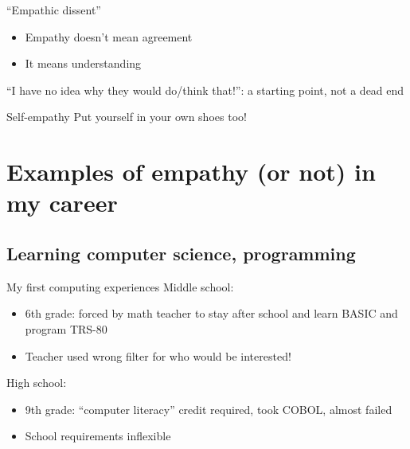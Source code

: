 %

\begin{frame}{``Empathic dissent''}
  \begin{itemize}
  \item Empathy doesn't mean agreement
  \item It means understanding
  \end{itemize}

  ``I have no idea why they would do/think that!'': a starting point,
  not a dead end
\end{frame}

\begin{frame}{Self-empathy}
  Put yourself in your own shoes too!
\end{frame}

\section{Examples of empathy (or not) in my career}

\subsection{Learning computer science, programming}

\begin{frame}{My first computing experiences}
  Middle school:
  \begin{itemize}
  \item 6th grade: forced by math teacher to stay after school and
    learn BASIC and program TRS-80
  \item Teacher used wrong filter for who would be interested!
  \end{itemize}

  High school:
  \begin{itemize}
  \item 9th grade: ``computer literacy'' credit required, took COBOL,
    almost failed
  \item School requirements inflexible
  \end{itemize}
\end{frame}


